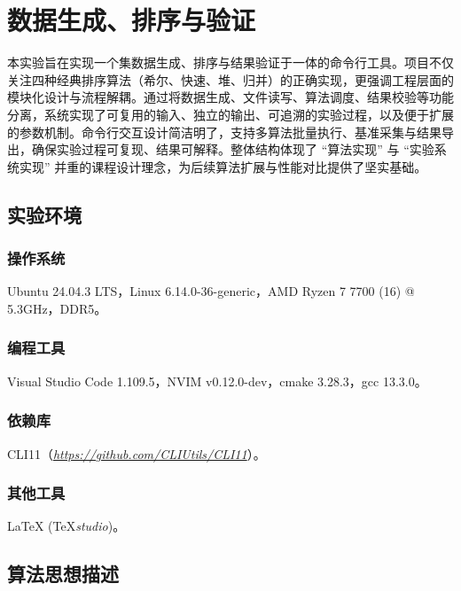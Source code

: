 \documentclass[12pt, a4paper]{ctexart}
\begin{document}
\pagestyle{empty}

\tableofcontents
\newpage

\pagestyle{plain}
\setcounter{page}{1}

\section{数据生成、排序与验证}

本实验旨在实现一个集数据生成、排序与结果验证于一体的命令行工具。项目不仅关注四种经典排序算法（希尔、快速、堆、归并）的正确实现，更强调工程层面的模块化设计与流程解耦。通过将数据生成、文件读写、算法调度、结果校验等功能分离，系统实现了可复用的输入、独立的输出、可追溯的实验过程，以及便于扩展的参数机制。命令行交互设计简洁明了，支持多算法批量执行、基准采集与结果导出，确保实验过程可复现、结果可解释。整体结构体现了 ``算法实现'' 与 ``实验系统实现'' 并重的课程设计理念，为后续算法扩展与性能对比提供了坚实基础。

\subsection{实验环境}

\subsubsection{操作系统}

Ubuntu 24.04.3 LTS，Linux 6.14.0-36-generic，AMD Ryzen 7 7700 (16) @ 5.3GHz，DDR5。

\subsubsection{编程工具}

Visual Studio Code 1.109.5，NVIM v0.12.0-dev，cmake 3.28.3，gcc 13.3.0。

\subsubsection{依赖库}

CLI11（\href{https://github.com/CLIUtils/CLI11}{\textit{https://github.com/CLIUtils/CLI11}}）。

\subsubsection{其他工具}

\LaTeX{} (\TeX\textit{studio})。

\subsection{算法思想描述}
\end{document}
